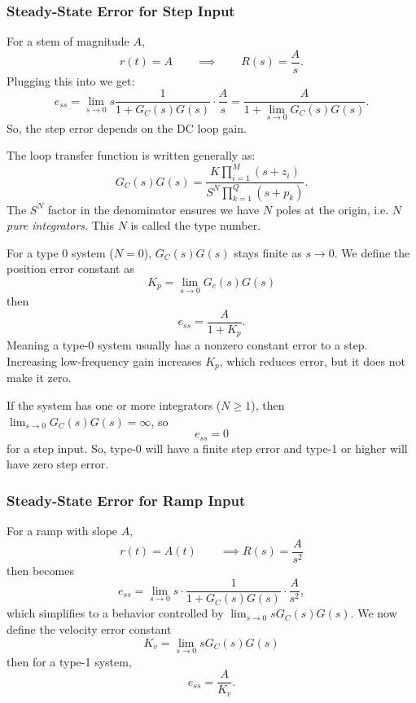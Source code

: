 \subsubsection{Steady-State Error for Step Input}
For a stem of magnitude $A$,
\begin{equation*}
  r(t) = A \qquad \implies \qquad R(s) = \frac{A}{s}
.\end{equation*}
Plugging this into  we get:
\begin{equation*}
  e_{ss} = \lim_{s \to 0} s \frac{1}{1 + G_C(s) G(s)} \cdot \frac{A}{s} = \frac{A}{1 + \lim_{s \to 0} G_C(s) G(s)}
.\end{equation*}
So, the step error depends on the DC loop gain.

The loop transfer function is written generally as:
\begin{equation*}
  G_C(s) G(s) = \frac{K \prod_{i = 1}^{M} (s + z_i)}{S^{N} \prod_{k = 1}^{Q} (s + p_k)}
.\end{equation*}
The $S^{N}$ factor in the denominator ensures we have $N$ poles at the origin, i.e. $N$ \textit{pure integrators}.
This $N$ is called the type number.

For a type 0 system ($N = 0$), $G_C(s) G(s)$ stays finite as $s \to 0$.
We define the position error constant as
\begin{equation*}
  K_p = \lim_{s \to 0} G_c(s) G(s)
\end{equation*}
then
\begin{equation*}
  e_{ss} = \frac{A}{1 + K_p}
.\end{equation*}
Meaning a type-0 system usually has a nonzero constant error to a step.
Increasing low-frequency gain increases $K_p$, which reduces error, but it does not make it zero.

If the system has one or more integrators ($N \geq 1$), then $\lim_{s \to 0} G_C(s) G(s) = \infty$, so
\begin{equation*}
  e_{ss} = 0
\end{equation*}
for a step input.
So, type-0 will have a finite step error and type-1 or higher will have zero step error.

\subsubsection{Steady-State Error for Ramp Input}
For a ramp with slope $A$,
\begin{equation*}
  r(t) = A(t) \qquad \implies R(s) = \frac{A}{s^2}
\end{equation*}
then  becomes
\begin{equation*}
  e_{ss} = \lim_{s \to 0}s \cdot \frac{1}{1 + G_C(s) G(s)} \cdot \frac{A}{s^2}
,\end{equation*}
which simplifies to a behavior controlled by $\lim_{s \to 0} s G_C(s) G(s)$.
We now define the velocity error constant
\begin{equation*}
  K_v = \lim_{s \to 0}s G_C(s) G(s)
\end{equation*}
then for a type-1 system,
\begin{equation*}
  e_{ss} = \frac{A}{K_v}
.\end{equation*}

